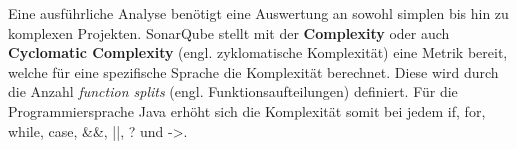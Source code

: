 Eine ausführliche Analyse benötigt eine Auswertung an sowohl simplen bis hin zu komplexen Projekten. SonarQube stellt mit der \textbf{Complexity} oder auch \textbf{Cyclomatic Complexity} (engl. zyklomatische Komplexität) eine Metrik bereit, welche für eine spezifische Sprache die Komplexität berechnet. Diese wird durch die Anzahl \textit{function splits} (engl. Funktionsaufteilungen) definiert. Für die Programmiersprache Java erhöht sich die Komplexität somit bei jedem \colorbox{gray!20}{if}, \colorbox{gray!20}{for}, \colorbox{gray!20}{while}, \colorbox{gray!20}{case}, \colorbox{gray!20}{\&\&}, \colorbox{gray!20}{||}, \colorbox{gray!20}{?} und \colorbox{gray!20}{->}. \cite*{MetricDefinition}
